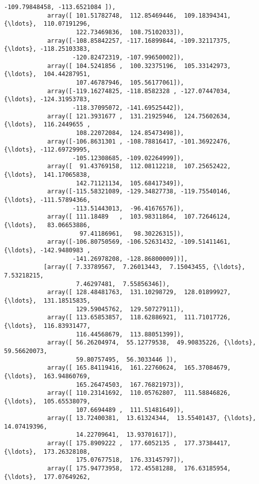 \documentclass[11pt]{article}
\begin{document}
\begin{Verbatim}[commandchars=\\\{\}]
                   -109.79848458, -113.6521084 ]),
            array([ 101.51782748,  112.85469446,  109.18394341, {\ldots},  110.07191296,
                    122.73469836,  108.75102033]),
            array([-108.85842257, -117.16899844, -109.32117375, {\ldots}, -118.25103383,
                   -120.82472319, -107.99650002]),
            array([ 104.5241856 ,  100.32375196,  105.33142973, {\ldots},  104.44287951,
                    107.46787946,  105.56177061]),
            array([-119.16274825, -118.8582328 , -127.07447034, {\ldots}, -124.31953783,
                   -118.37095072, -141.69525442]),
            array([ 121.3931677 ,  131.21925946,  124.75602634, {\ldots},  116.2449655 ,
                    108.22072084,  124.85473498]),
            array([-106.8631301 , -108.78816417, -101.36922476, {\ldots}, -112.69729995,
                   -105.12308685, -109.02264999]),
            array([  91.43769158,  112.08112218,  107.25652422, {\ldots},  141.17065838,
                    142.71121134,  105.68417349]),
            array([-115.58321089, -129.34827738, -119.75540146, {\ldots}, -111.57894366,
                   -113.51443013,  -96.41676576]),
            array([ 111.18489   ,  103.98311864,  107.72646124, {\ldots},   83.06653886,
                     97.41186961,   98.30226315]),
            array([-106.80750569, -106.52631432, -109.51411461, {\ldots}, -142.9480983 ,
                   -141.26978208, -128.86800009])],
           [array([ 7.33789567,  7.26013443,  7.15043455, {\ldots},  7.53218215,
                    7.46297481,  7.55856346]),
            array([ 128.48481763,  131.10298729,  128.01899927, {\ldots},  131.18515835,
                    129.59045762,  129.50727911]),
            array([ 113.65853857,  118.62886921,  111.71017726, {\ldots},  116.83931477,
                    116.44568679,  113.88051399]),
            array([ 56.26204974,  55.12779538,  49.90835226, {\ldots},  59.56620073,
                    59.80757495,  56.3033446 ]),
            array([ 165.84119416,  161.22760624,  165.37084679, {\ldots},  163.94860769,
                    165.26474503,  167.76821973]),
            array([ 110.23141692,  110.05762807,  111.58846826, {\ldots},  105.65538079,
                    107.6694489 ,  111.51481649]),
            array([ 13.72400381,  13.61324344,  13.55401437, {\ldots},  14.07419396,
                    14.22709641,  13.93701617]),
            array([ 175.8909222 ,  177.6052135 ,  177.37384417, {\ldots},  173.26328108,
                    175.07677518,  176.33145797]),
            array([ 175.94773958,  172.45581288,  176.63185954, {\ldots},  177.07649262,

\end{Verbatim}
\end{document}
